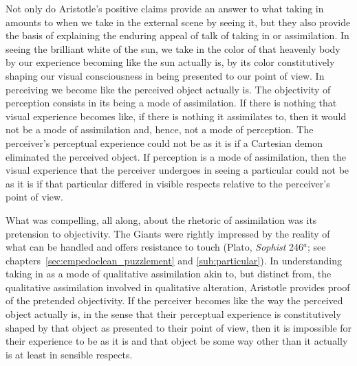 Not only do Aristotle's positive claims provide an answer to what taking in amounts to when we take in the external scene by seeing it, but they also provide the basis of explaining the enduring appeal of talk of taking in or assimilation. In seeing the brilliant white of the sun, we take in the color of that heavenly body by our experience becoming like the sun actually is, by its color constitutively shaping our visual consciousness in being presented to our point of view. In perceiving we become like the perceived object actually is. The objectivity of perception consists in its being a mode of assimilation. If there is nothing that visual experience becomes like, if there is nothing it assimilates to, then it would not be a mode of assimilation and, hence, not a mode of perception. The perceiver's perceptual experience could not be as it is if a Cartesian demon eliminated the perceived object. If perception is a mode of assimilation, then the visual experience that the perceiver undergoes in seeing a particular could not be as it is if that particular differed in visible respects relative to the perceiver's point of view.

What was compelling, all along, about the rhetoric of assimilation was its pretension to objectivity. The Giants were rightly impressed by the reality of what can be handled and offers resistance to touch (Plato, \emph{Sophist} 246\( ^{a} \); see chapters~\ref{sec:empedoclean_puzzlement} and \ref{sub:particular}). In understanding taking in as a mode of qualitative assimilation akin to, but distinct from, the qualitative assimilation involved in qualitative alteration, Aristotle provides proof of the pretended objectivity. If the perceiver becomes like the way the perceived object actually is, in the sense that their perceptual experience is constitutively shaped by that object as presented to their point of view, then it is impossible for their experience to be as it is and that object be some way other than it actually is at least in sensible respects.

